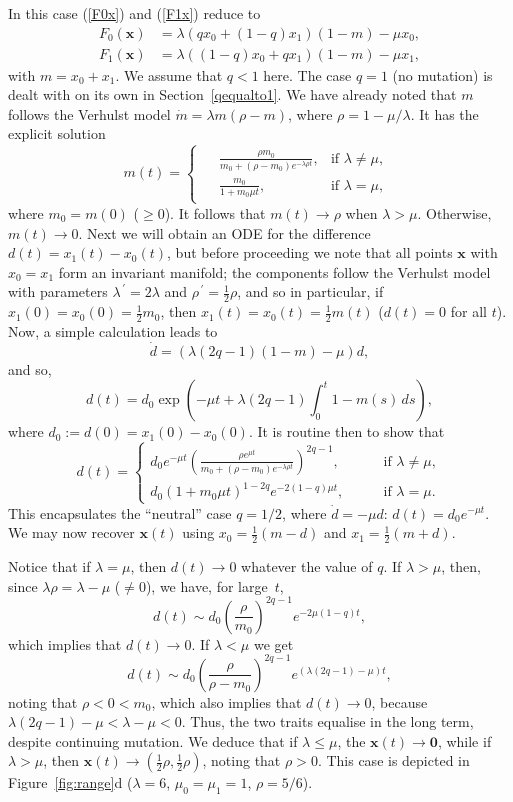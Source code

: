 \documentclass[12pt]{article}
\newcommand{\ds}{\displaystyle}
\newcommand{\myprime}{\,\prime}
\newcommand{\bzero}{\boldsymbol{0}}
\newcommand{\bx}{\boldsymbol{x}}
\begin{document}
In this case (\ref{F0x}) and (\ref{F1x}) reduce to
\begin{align*}
F_0(\bx) &=\lambda(q x_0 + (1-q)x_1)(1-m)-\mu x_0,
\\
F_1(\bx) &=\lambda((1-q) x_0 + q x_1)(1-m)-\mu x_1,
\end{align*}
with $m=x_0+x_1$. We assume that $q<1$ here. The case $q=1$
(no mutation) is dealt with on its own in Section~\ref{qequalto1}.
We have already noted that
$m$ follows the Verhulst model
$\dot{m} =\lambda m\left(\rho -m \right)$,
where $\rho=1-\mu/\lambda$. It has the explicit solution
\[
m(t)=
\begin{cases}
\begin{aligned}
&{\ds \frac{\rho m_0}{m_0 + (\rho-m_0)e^{-\lambda\rho t}},}
&\text{if } \lambda\neq \mu,\\[1ex]
&{\ds \frac{m_0}{1+m_0 \mu t},}
&\text{if } \lambda=\mu,
\end{aligned}
\end{cases}
\]
where $m_0=m(0)$ ($\geq 0$).
It follows that $m(t)\to \rho$ when $\lambda>\mu$. Otherwise,
$m(t)\to 0$.
Next we will obtain an ODE for the difference $d(t)=x_1(t)-x_0(t)$, but
before proceeding we note that all points $\bx$ with $x_0=x_1$ form an
invariant manifold; the components follow the Verhulst model with
parameters $\lambda^{\myprime}=2\lambda$ and $\rho^{\myprime}=\frac12
\rho$, and so in particular, if $x_1(0)=x_0(0)=\frac12 m_0$, then
$x_1(t)=x_0(t)=\frac12 m(t)$ ($d(t)=0$ for all $t$). Now, a simple
calculation leads to
$$ 
{\dot d} = (\lambda(2q-1)(1-m)-\mu)d,
$$
and so,
$$
d(t) = d_0 \exp\left( -\mu t + \lambda(2q-1)\int_0^t 1-m(s)\, ds
\right),
$$
where $d_0:=d(0)=x_1(0)-x_0(0)$. 
It is routine then to show that
$$
d(t) 
= 
\begin{cases}
{\ds 
d_0 e^{-\mu t}
\left(
  \frac{\rho e^{\mu t}}{m_0 + (\rho-m_0)e^{-\lambda\rho t}} 
\right)^{2q-1},
}
\qquad &\text{if } \lambda\neq \mu, \\[12pt]
d_0 (1+ m_0 \mu t)^{1-2q} e^{-2(1-q)\mu t},
\qquad &\text{if } \lambda= \mu.
\end {cases}
$$
This encapsulates the ``neutral'' case $q=1/2$, where $\dot{d}=-\mu d$:
$d(t)=d_0e^{-\mu t}$. We may now recover $\bx(t)$ using 
$x_0= \frac12 (m-d)$ and $x_1= \frac12 (m+d)$. 

Notice that if $\lambda=\mu$, then $d(t)\to 0$ whatever the value of $q$. 
If $\lambda>\mu$, then, since $\lambda \rho = \lambda - \mu$ ($\neq 0$),
we have, for large~$t$,
$$
d(t)
\sim
d_0 \left(\frac{\rho}{m_0}\right)^{2q-1}e^{-2\mu (1-q)t},
$$
which implies that $d(t)\to 0$. If $\lambda<\mu$ we get 
$$
d(t)
\sim
d_0 \left(\frac{\rho}{\rho-m_0}\right)^{2q-1}e^{(\lambda(2q-1)-\mu)t},
$$
noting that $\rho<0<m_0$,
which also implies that $d(t)\to 0$, because
$\lambda(2q-1)-\mu < \lambda - \mu <0$. 
Thus, the two traits equalise in the long term, despite continuing
mutation.
We deduce that if $\lambda\leq \mu$,
the $\bx(t)\to\bzero$, while if $\lambda>\mu$, then
$\bx(t)\to ( \frac12 \rho, \frac12 \rho)$, noting that $\rho>0$.
This case is depicted in Figure~\ref{fig:range}d
($\lambda=6$, $\mu_0=\mu_1=1$, $\rho=5/6$).
\end{document}
